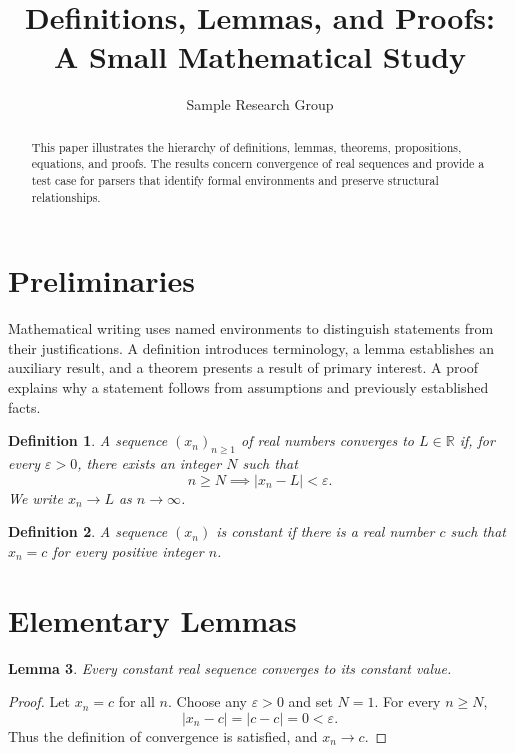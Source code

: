 \documentclass{article}
\title{Definitions, Lemmas, and Proofs: A Small Mathematical Study}
\author{Sample Research Group}
\date{}
\newtheorem{definition}{Definition}[section]
\newtheorem{lemma}[definition]{Lemma}
\begin{document}
\maketitle

\begin{abstract}
This paper illustrates the hierarchy of definitions, lemmas, theorems,
propositions, equations, and proofs. The results concern convergence of
real sequences and provide a test case for parsers that identify formal
environments and preserve structural relationships.
\end{abstract}

\section{Preliminaries}

Mathematical writing uses named environments to distinguish statements
from their justifications. A definition introduces terminology, a lemma
establishes an auxiliary result, and a theorem presents a result of
primary interest. A proof explains why a statement follows from
assumptions and previously established facts.

\begin{definition}
A sequence $(x_n)_{n\geq 1}$ of real numbers converges to
$L\in\mathbb{R}$ if, for every $\varepsilon>0$, there exists an integer
$N$ such that
\begin{equation}
n\geq N \implies |x_n-L|<\varepsilon.
\end{equation}
We write $x_n\to L$ as $n\to\infty$.
\end{definition}

\begin{definition}
A sequence $(x_n)$ is constant if there is a real number $c$ such that
$x_n=c$ for every positive integer $n$.
\end{definition}

\section{Elementary Lemmas}

\begin{lemma}
Every constant real sequence converges to its constant value.
\end{lemma}

\begin{proof}
Let $x_n=c$ for all $n$. Choose any $\varepsilon>0$ and set $N=1$.
For every $n\geq N$,
\[
|x_n-c|=|c-c|=0<\varepsilon.
\]
Thus the definition of convergence is satisfied, and $x_n\to c$.
\end{proof}
\end{document}
